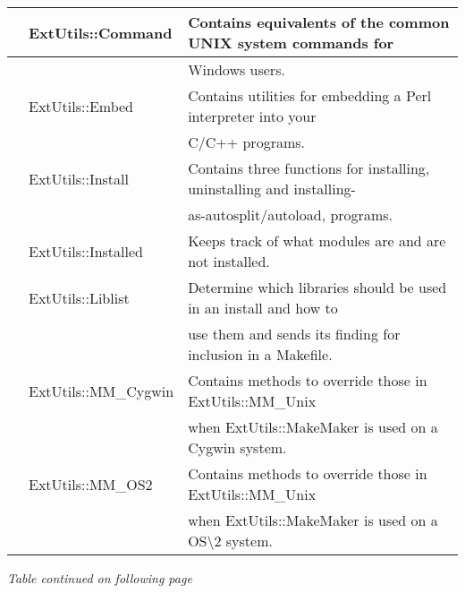 \documentclass[a4paper,11pt]{book}
\begin{document}
\begin{tabular}{|p{0.3in}|p{1.2in}|p{2.7in}|}
 & ExtUtils::Command & Contains equivalents of the common UNIX system commands for \\ \hline 
 &  & Windows users. \\ \hline 
 & ExtUtils::Embed & Contains utilities for embedding a Perl interpreter into your \\ \hline 
 &  & C/C++ programs. \\ \hline 
 & ExtUtils::Install & Contains three functions for installing, uninstalling and installing- \\ \hline 
 &  & as-autosplit/autoload, programs. \\ \hline 
 & ExtUtils::Installed & Keeps track of what modules are and are not installed. \\ \hline 
 & ExtUtils::Liblist & Determine which libraries should be used in an install and how to \\ \hline 
 &  & use them and sends its finding for inclusion in a Makefile. \\ \hline 
 & ExtUtils::MM\_Cygwin & Contains methods to override those in ExtUtils::MM\_Unix \\ \hline 
 &  & when ExtUtils::MakeMaker is used on a Cygwin system. \\ \hline 
 & ExtUtils::MM\_OS2 & Contains methods to override those in ExtUtils::MM\_Unix \\ \hline 
 &  & when ExtUtils::MakeMaker is used on a OS\textbackslash 2 system. \\ \hline 
\end{tabular}

\textit{Table continued on following page}

\noindent 

\noindent 
\end{document}
